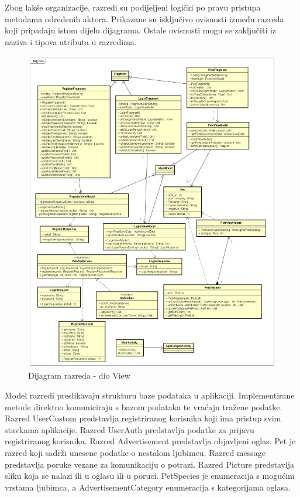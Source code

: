 			Zbog lakše organizacije, razredi su podijeljeni logički po pravu pristupa metodama određenih aktora. Prikazane su isključivo ovisnosti između razreda koji pripadaju istom dijelu dijagrama. Ostale ovisnosti mogu se zaključiti iz naziva i tipova atributa u razredima.

			\begin{figure}[H]
				\includegraphics[scale=0.45]{dijagrami/dijagramiRazreda/View.PNG} %
				\centering
				\caption{Dijagram razreda - dio View}
				\label{fig:drView}
			\end{figure}

			Model razredi preslikavaju strukturu baze podataka u aplikaciji. Implementirane metode direktno komuniciraju s bazom podataka te vraćaju tražene podatke. Razred UserCustom predstavlja registriranog korisnika koji ima pristup svim stavkama aplikacije. Razred UserAuth predstavlja podatke za prijavu registriranog korisnika. Razred Advertisement predstavlja objavljeni oglas. Pet je razred koji sadrži unesene podatke o nestalom ljubimcu. Razred message predstavlja poruke vezane za komunikaciju o potrazi. Razred Picture predstavlja sliku koja se nalazi ili u oglasu ili u poruci. PetSpecies je enumeracija s mogućim vrstama ljubimca, a AdvertisementCategory enumeracija s kategorijama oglasa.

